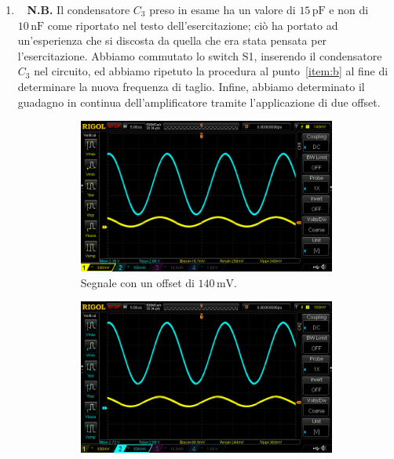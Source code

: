 \documentclass[a4paper]{article}
\begin{document}
\begin{enumerate}[label=\alph*.]
\begin{figure}[h!]
\begin{subfigure}{0.4\textwidth}
							\caption{Segnale con un offset di $ 180 \, \mathrm{mV} $.}
						\end{subfigure}
						\label{fig:punto2.4.3.c}
					\end{figure}
				\item \ 
					\newline
					\textbf{N.B.} Il condensatore $ C_{3} $ preso in esame ha un valore di $ 15 \, \mathrm{pF} $ e non di $ 10 \, \mathrm{nF} $ come riportato nel testo dell'esercitazione; ciò ha portato ad un'esperienza che si discosta da quella che era stata pensata per l'esercitazione.
					\newline
					\newline
					Abbiamo commutato lo switch S1, inserendo il condensatore $ C_{3} $ nel circuito, ed abbiamo ripetuto la procedura al punto~\ref{item:b} al fine di determinare la nuova frequenza di taglio.
					\newline
					Infine, abbiamo determinato il guadagno in continua dell'amplificatore tramite l'applicazione di due offset.
					\begin{figure}[h!]
						\centering
						\begin{subfigure}{0.4\textwidth}
							\centering
							\includegraphics[scale=0.2]{offset140C3}
							\caption{Segnale con un offset di $ 140 \, \mathrm{mV} $.}
						\end{subfigure}
						\begin{subfigure}{0.4\textwidth}
							\centering
							\includegraphics[scale=0.2]{offset180C3}

\end{subfigure}
\end{figure}
\end{enumerate}
\end{document}
